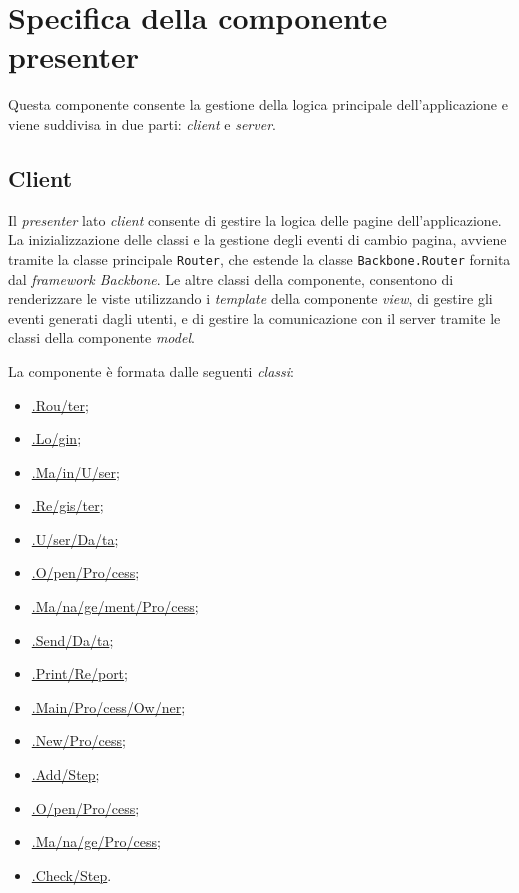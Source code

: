 \section{Specifica della componente presenter}
Questa componente consente la gestione della logica principale dell'applicazione \progetto{} e viene suddivisa in due parti: \textit{client} e \textit{server}.

\subsection{Client}

Il \textit{presenter} lato \textit{client} consente di gestire la logica delle pagine dell'applicazione.
La inizializzazione delle classi e la gestione degli eventi di cambio pagina, avviene tramite la classe principale \texttt{Router}, che estende la classe \texttt{Backbone.Router} fornita dal \textit{framework Backbone}.
Le altre classi della componente, consentono di renderizzare le viste utilizzando i \textit{template} della componente \textit{view}, di gestire gli eventi generati dagli utenti, e di gestire la comunicazione con il server tramite le classi della componente \textit{model}.

La componente è formata dalle seguenti \textit{classi}:
\begin{itemize}
	\item \hyperref[router]{\logic{}.Rou\fshyp{}ter};
	\item \hyperref[login]{\logic{}.Lo\fshyp{}gin};
	\item \hyperref[mainUser]{\logicUser{}.Ma\fshyp{}in\fshyp{}U\fshyp{}ser};
	\item \hyperref[register]{\logicUser{}.Re\fshyp{}gis\fshyp{}ter};
	\item \hyperref[userData]{\logicUser{}.U\fshyp{}ser\fshyp{}Da\fshyp{}ta};
	\item \hyperref[openProcessU]{\logicUser{}.O\fshyp{}pen\fshyp{}Pro\fshyp{}cess};
	\item \hyperref[managementProcessU]{\logicUser{}.Ma\fshyp{}na\fshyp{}ge\fshyp{}ment\fshyp{}Pro\fshyp{}cess};
	\item \hyperref[sendData]{\logicUser{}.Send\fshyp{}Da\fshyp{}ta};
	\item \hyperref[printReport]{\logicUser{}.Print\fshyp{}Re\fshyp{}port};
	\item \hyperref[mainProcessOwner]{\logicAdmin{}.Main\fshyp{}Pro\fshyp{}cess\fshyp{}Ow\fshyp{}ner};
	\item \hyperref[newProcess]{\logicAdmin{}.New\fshyp{}Pro\fshyp{}cess};
	\item \hyperref[addStep]{\logicAdmin{}.Add\fshyp{}Step};
	\item \hyperref[openProcess]{\logicAdmin{}.O\fshyp{}pen\fshyp{}Pro\fshyp{}cess};
	\item \hyperref[manageProcess]{\logicAdmin{}.Ma\fshyp{}na\fshyp{}ge\fshyp{}Pro\fshyp{}cess};
	\item \hyperref[checkStep]{\logicAdmin{}.Check\fshyp{}Step}.
	
\end{itemize}


